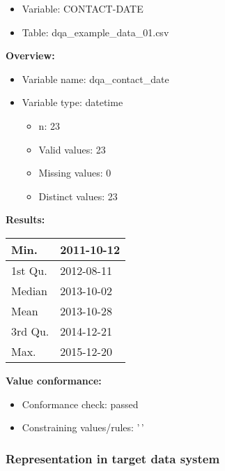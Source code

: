 \documentclass[
]{article}
\providecommand{\tightlist}{%
  \setlength{\itemsep}{0pt}\setlength{\parskip}{0pt}}
\begin{document}
\begin{itemize}
\tightlist
\item
  Variable: CONTACT-DATE
\item
  Table: dqa\_example\_data\_01.csv
\end{itemize}

\textbf{Overview:}

\begin{itemize}
\tightlist
\item
  Variable name: dqa\_contact\_date
\item
  Variable type: datetime

  \begin{itemize}
  \tightlist
  \item
    n: 23
  \item
    Valid values: 23
  \item
    Missing values: 0
  \item
    Distinct values: 23
  \end{itemize}
\end{itemize}

\textbf{Results:}\\

\begin{table}[H]
\centering
\begin{tabular}{l|l}
\hline
Min. & 2011-10-12\\
\hline
1st Qu. & 2012-08-11\\
\hline
Median & 2013-10-02\\
\hline
Mean & 2013-10-28\\
\hline
3rd Qu. & 2014-12-21\\
\hline
Max. & 2015-12-20\\
\hline
\end{tabular}
\end{table}

\textbf{Value conformance:}

\begin{itemize}
\tightlist
\item
  Conformance check: passed
\item
  Constraining values/rules: '\,'
\end{itemize}

\newpage

\hypertarget{representation-in-target-data-system-5}{%
\subsubsection{\texorpdfstring{Representation in \textbf{target} data
system}{Representation in target data system}}\label{representation-in-target-data-system-5}}
\end{document}
